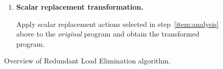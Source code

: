 {\begin{figure}
{\begin{enumerate}
\begin{enumerate}
\item Compute $\DRS = \{\;  \mbox{def $A_i[\vec{k}]$} \; | \; \exists \; \mbox{use $A_j[\vec{x}] \in \URS$ with $\V(\vec{x})=\V(\vec{k})$} \; \}$ \ie\ def  $A_i[\vec{k}]$ is placed in \DRS\ 
if and only if a use $A_j[\vec{x}]$ was placed in \URS\ with  $\V(\vec{x})=\V(\vec{k})$.
\end{enumerate}

\item \label{item:transform}
{\bf Scalar replacement transformation.}

Apply scalar replacement actions selected in step~\ref{item:analysis}
above
to the {\it original} program and
obtain the transformed program.

\end{enumerate}
}
\caption{Overview of Redundant Load Elimination algorithm.}
\label{fig:overview}
\end{figure}
}
